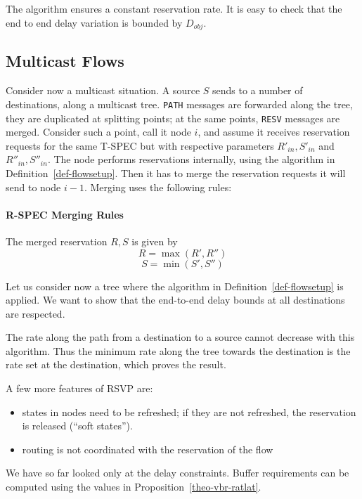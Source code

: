 The algorithm ensures a constant reservation rate. It is easy to
check that the end to end delay variation is bounded by $D_{obj}$.

\subsection{Multicast Flows}

Consider now a multicast situation. A source $S$ sends to a number
of destinations, along a multicast tree. \texttt{PATH} messages
are forwarded along the tree, they are duplicated at splitting
points; at the same points, \texttt{RESV} messages are merged.
Consider such a point, call it node $i$, and assume it receives
reservation requests for the same T-SPEC but with respective
parameters $R'_{in}, S'_{in}$ and $R''_{in}, S''_{in}$. The node
performs reservations internally, using the algorithm in Definition~\ref{def-flowsetup}. Then it has to merge the reservation requests it will send to
node $i-1$. Merging uses the following rules:

\paragraph{R-SPEC Merging Rules} The merged reservation $R,S$ is
given by
$$R = \max(R', R'')$$
$$S= \min(S', S'')$$

Let us consider now a tree where the algorithm in Definition~\ref{def-flowsetup} is applied. We want
to show that the end-to-end delay bounds at all destinations are
respected.

The rate along the path from a destination to a source cannot
decrease with this algorithm. Thus the minimum rate along the tree
towards the destination is the rate set at the destination, which
proves the result.

A few more features of RSVP are:
\begin{itemize}
    \item  states in nodes need to be refreshed; if they are not
    refreshed, the reservation is released (``soft states'').

    \item  routing is not coordinated with the reservation of the flow

\end{itemize}
We have so far looked only at the delay constraints. Buffer
requirements can be computed using the values in
Proposition~\ref{theo-vbr-ratlat}.
